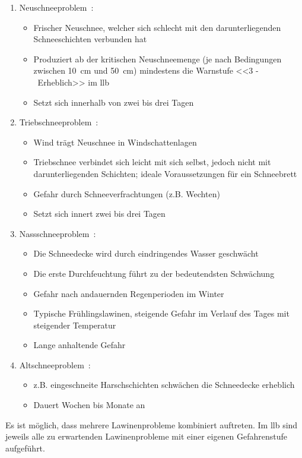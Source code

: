 \begin{enumerate}
  \item Neuschneeproblem~\cite{harveyrhynerschweizerlawinenkunde}\cite{achtunglawine}:
  \begin{itemize}
    \item Frischer Neuschnee, welcher sich schlecht mit den darunterliegenden Schneeschichten verbunden hat
    \item Produziert ab der kritischen Neuschneemenge (je nach Bedingungen zwischen \qty{10}{cm} und \qty{50}{cm}) mindestens die Warnstufe <<3 -~Erheblich>> im \acrfull{llb}
    \item Setzt sich innerhalb von zwei bis drei Tagen
  \end{itemize}
  \item Triebschneeproblem~\cite{harveyrhynerschweizerlawinenkunde}\cite{achtunglawine}:
  \begin{itemize}
    \item Wind trägt Neuschnee in Windschattenlagen
    \item Triebschnee verbindet sich leicht mit sich selbst, jedoch nicht mit darunterliegenden Schichten; ideale Voraussetzungen für ein Schneebrett
    \item Gefahr durch Schneeverfrachtungen (z.B. Wechten)
    \item Setzt sich innert zwei bis drei Tagen
  \end{itemize}
  \item Nassschneeproblem~\cite{harveyrhynerschweizerlawinenkunde}\cite{achtunglawine}:
  \begin{itemize}
    \item Die Schneedecke wird durch eindringendes Wasser geschwächt
    \item Die erste Durchfeuchtung führt zu der bedeutendsten Schwächung
    \item Gefahr nach andauernden Regenperioden im Winter
    \item Typische Frühlingslawinen, steigende Gefahr im Verlauf des Tages mit steigender Temperatur
    \item Lange anhaltende Gefahr
  \end{itemize}
  \item Altschneeproblem~\cite{harveyrhynerschweizerlawinenkunde}\cite{achtunglawine}:
  \begin{itemize}
    \item z.B. eingeschneite Harschschichten schwächen die Schneedecke erheblich
    \item Dauert Wochen bis Monate an
  \end{itemize}
\end{enumerate}
Es ist möglich, dass mehrere Lawinenprobleme kombiniert auftreten. Im \gls{llb} sind jeweils alle zu erwartenden Lawinenprobleme mit einer eigenen Gefahrenstufe aufgeführt.~\cite{slfTypischeLawinenprobleme}


